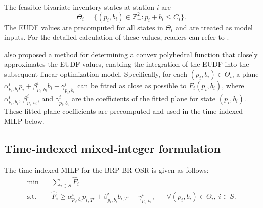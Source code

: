 The feasible bivariate inventory states at station $i$ are
\begin{equation}
\Theta_i=\{(p_i,b_i)\in\mathbb{Z}_+^2:p_i+b_i\le C_i\}.
\label{eq:eudf-domain}
\end{equation}
The EUDF values are precomputed for all states in $\Theta_i$ and are treated as
model inputs. For the detailed calculation of these values, readers can refer to
\citet{kaspiBikesharingSystemsUser2017}.

\citet{kaspiBikesharingSystemsUser2017} also proposed a method for determining
a convex polyhedral function that closely approximates the EUDF values, enabling
the integration of the EUDF into the subsequent linear optimization model.
Specifically, for each $(p_i,b_i)\in\Theta_i$, a plane
$\alpha^i_{p_i,b_i}p_i+\beta^i_{p_i,b_i}b_i+\gamma^i_{p_i,b_i}$ can be fitted
as close as possible to $F_i(p_i,b_i)$, where
$\alpha^i_{p_i,b_i}$, $\beta^i_{p_i,b_i}$, and $\gamma^i_{p_i,b_i}$ are the
coefficients of the fitted plane for state $(p_i,b_i)$. These fitted-plane
coefficients are precomputed and used in the time-indexed MILP below.

\subsection{Time-indexed mixed-integer formulation}\label{sec:milp}

The time-indexed MILP for the BRP-BR-OSR is given as follows:
\begin{align}
\min \quad & \sum_{i\in S}\hat F_i \label{eq:milp-objective}\\
\text{s.t.}\quad
&\hat F_i\ge
\alpha^i_{p_i,b_i}p_{i,T'}
+\beta^i_{p_i,b_i}b_{i,T'}
+\gamma^i_{p_i,b_i},
&&\forall (p_i,b_i)\in\Theta_i,\ i\in S.
\label{eq:eudf-linearization}
\end{align}

